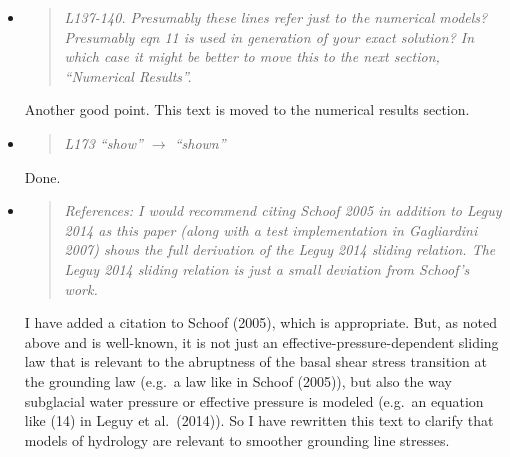 \documentclass[11pt,reqno]{amsart}
\newcommand{\reply}[2]{
\medskip\medskip
\item  \begin{quote}
\emph{#1}
\end{quote}

\medskip
\noindent #2}
\begin{document}
\begin{itemize}
\reply{L137-140. Presumably these lines refer just to the numerical models? Presumably eqn 11 is used in generation of your exact solution? In which case it might be better to move this to the next section, ``Numerical Results''.}
{Another good point.  This text is moved to the numerical results section.}

\reply{L173 ``show'' $\to$ ``shown''}
{Done.}

\reply{References: I would recommend citing Schoof 2005 in addition to Leguy 2014 as this paper (along with a test implementation in Gagliardini 2007) shows the full derivation of the Leguy 2014 sliding relation. The Leguy 2014 sliding relation is just a small deviation from Schoof's work.}
{I have added a citation to Schoof (2005), which is appropriate.  But, as noted above and is well-known, it is not just an effective-pressure-dependent sliding law that is relevant to the abruptness of the basal shear stress transition at the grounding law (e.g.~a law like in Schoof (2005)), but also the way subglacial water pressure or effective pressure is modeled (e.g.~an equation like (14) in Leguy et al.~(2014)).  So I have rewritten this text to clarify that models of hydrology are relevant to smoother grounding line stresses.}

\end{itemize}


%
%
\end{document}
